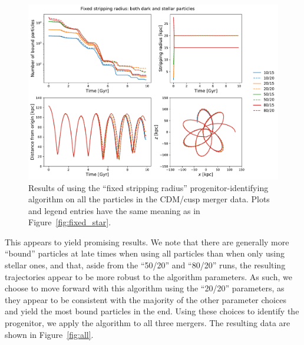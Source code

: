 \begin{figure}
    \centering
    \includegraphics[width=0.9\linewidth]{figs/fixed_both.pdf}
    \caption{%
        Results of using the ``fixed stripping radius'' progenitor-identifying
        algorithm on all the particles in the CDM/cusp merger data. Plots and
        legend entries have the same meaning as in
        Figure~\ref{fig:fixed_star}.
    }
    \label{fig:fixed_both}
\end{figure}

This appears to yield promising results. We note that there are generally more
``bound'' particles at late times when using all particles than when only using
stellar ones, and that, aside from the ``50/20'' and ``80/20'' runs, the
resulting trajectories appear to be more robust to the algorithm parameters. As
such, we choose to move forward with this algorithm using the ``20/20''
parameters, as they appear to be consistent with the majority of the other
parameter choices and yield the most bound particles in the end. Using these
choices to identify the progenitor, we apply the algorithm to all three mergers.
The resulting data are shown in Figure~\ref{fig:all}.

